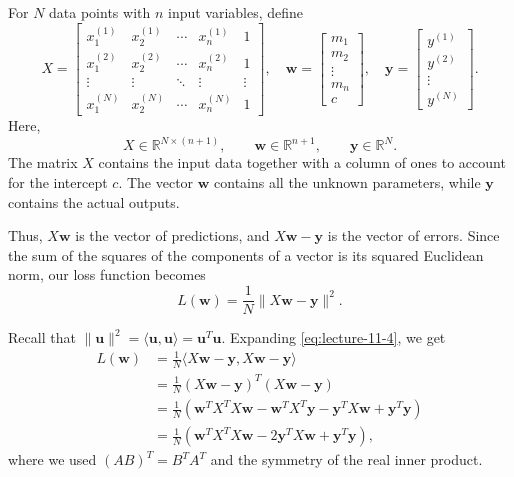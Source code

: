 For \(N\) data points with \(n\) input variables, define
\[
	X=
	\begin{bmatrix}
		x_1^{(1)} & x_2^{(1)} & \cdots & x_n^{(1)} & 1      \\
		x_1^{(2)} & x_2^{(2)} & \cdots & x_n^{(2)} & 1      \\
		\vdots    & \vdots    & \ddots & \vdots    & \vdots \\
		x_1^{(N)} & x_2^{(N)} & \cdots & x_n^{(N)} & 1
	\end{bmatrix},
	\quad
	\mathbf{w}=
	\begin{bmatrix}
		m_1 \\m_2\\\vdots\\m_n\\c
	\end{bmatrix},
	\quad
	\mathbf{y}=
	\begin{bmatrix}
		y^{(1)} \\y^{(2)}\\\vdots\\y^{(N)}
	\end{bmatrix}.
\]
Here,
\[
	X\in\mathbb{R}^{N\times(n+1)},
	\qquad
	\mathbf{w}\in\mathbb{R}^{n+1},
	\qquad
	\mathbf{y}\in\mathbb{R}^{N}.
\]
The matrix \(X\) contains the input data together with a column of ones to account for the intercept \(c\). The vector \(\mathbf{w}\) contains all the unknown parameters, while \(\mathbf{y}\) contains the actual outputs.

Thus, \(X\mathbf{w}\) is the vector of predictions, and \(X\mathbf{w}-\mathbf{y}\) is the vector of errors. Since the sum of the squares of the components of a vector is its squared Euclidean norm, our loss function becomes
\begin{equation}
	L(\mathbf{w})=\frac{1}{N}\|X\mathbf{w}-\mathbf{y}\|^2.
	\label{eq:lecture-11-4}
\end{equation}

Recall that \(\|\mathbf{u}\|^2=\langle\mathbf{u},\mathbf{u}\rangle=\mathbf{u}^T\mathbf{u}\). Expanding \autoref{eq:lecture-11-4}, we get
\[
	\begin{aligned}
		L(\mathbf{w})
		 & =\frac{1}{N}\langle X\mathbf{w}-\mathbf{y},
		X\mathbf{w}-\mathbf{y}\rangle                  \\
		 & =\frac{1}{N}(X\mathbf{w}-\mathbf{y})^T
		(X\mathbf{w}-\mathbf{y})                       \\
		 & =\frac{1}{N}\left(
		\mathbf{w}^TX^TX\mathbf{w}
		-\mathbf{w}^TX^T\mathbf{y}
		-\mathbf{y}^TX\mathbf{w}
		+\mathbf{y}^T\mathbf{y}
		\right)                                        \\
		 & =\frac{1}{N}\left(
		\mathbf{w}^TX^TX\mathbf{w}
		-2\mathbf{y}^TX\mathbf{w}
		+\mathbf{y}^T\mathbf{y}
		\right),
	\end{aligned}
\]
where we used \((AB)^T=B^TA^T\) and the symmetry of the real inner product.

